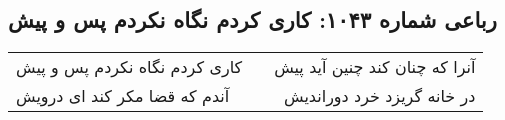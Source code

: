\begin{center}
\section*{رباعی شماره ۱۰۴۳: کاری کردم نگاه نکردم پس و پیش}
\label{sec:1043}
\begin{longtable}{l p{0.5cm} r}
کاری کردم نگاه نکردم پس و پیش
&&
آنرا که چنان کند چنین آید پیش
\\
آندم که قضا مکر کند ای درویش
&&
در خانه گریزد خرد دوراندیش
\\
\end{longtable}
\end{center}
